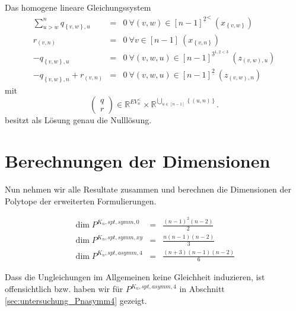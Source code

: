\documentclass[10p,a4paper,BCOR = 12mm, DIV=15]{scrbook}
\begin{document}
{\begin{Le}
\label{le:linearisiert_asymm4_vereinfacht}
Das homogene lineare Gleichungssystem
\begin{eqnarray*}
\sum_{u > w}^n q_{\left\{v, w\right\}, u} & = & 0\ \forall \left(v, w\right)\in {[n-1]^{\underline{2}}}^<\ \left(x_{\left\{v, w\right\}}\right) \\
r_{\left(v, n\right)} & = & 0\ \forall v \in [n-1]\ \left(x_{\left\{v, n\right\}}\right) \\
-q_{\left\{v, w\right\}, u} & = & 0\ \forall \left(v, w, u\right)\in [n-1]^{\underline{3}^{1,2<3}} \ \left(z_{\left(v, w\right), u}\right) \\
-q_{\left\{v, w\right\}, n} + r_{\left(v, n\right)} & = & 0\ \forall \left(v, w, u\right)\in [n-1]^{\underline{2}} \ \left(z_{\left(v, w\right), n}\right)
\end{eqnarray*}
mit
\begin{displaymath}
\left(\begin{array}{c}
q \\
r
\end{array}\right) \in 
\mathbb{R}^{EV_n^{<}}\times \mathbb{R}^{\bigcup_{u \in \left[n-1\right]} \left\{\left(u, n\right)\right\}}.
\end{displaymath}
besitzt als Lösung genau die Nulllösung.
\end{Le}

\section{Berechnungen der Dimensionen}

Nun nehmen wir alle Resultate zusammen und berechnen die Dimensionen der Polytope der erweiterten Formulierungen.

\begin{Sa}
\label{sa:dimension_formulierungen}
\begin{eqnarray*}
\dim P^{K_n, spt, symm, 0} & = & \frac{\left(n-1\right)^2 \left(n-2\right)}{2} \\
\dim P^{K_n, spt, symm, xy} & = & \frac{n \left(n-1\right)\left(n-2\right)}{3} \\
\dim P^{K_n, spt, asymm, 4} & = & \frac{\left(n+3\right)\left(n-1\right)\left(n-2\right)}{6}
\end{eqnarray*}
\end{Sa}
\begin{bew}
Dass die Ungleichungen im Allgemeinen keine Gleichheit induzieren, ist offensichtlich bzw. haben wir für $P^{K_n, spt, asymm, 4}$ in Abschnitt \ref{sec:untersuchung_Pnasymm4} gezeigt.


\end{bew}}
\end{document}
